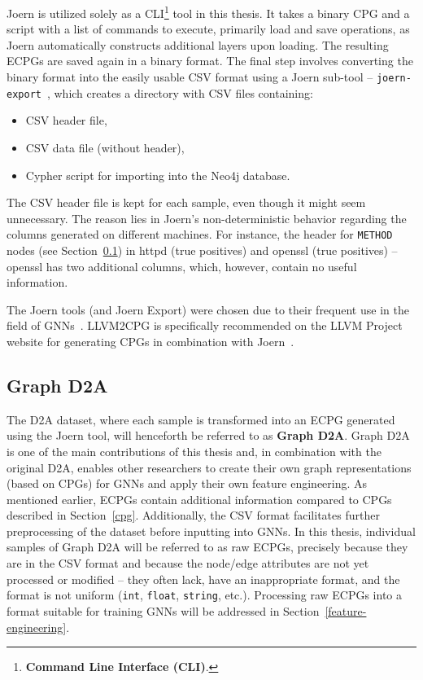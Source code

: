 Joern is utilized solely as a CLI\footnote{\textbf{Command Line Interface (CLI)}.} tool in this thesis. It takes a binary CPG and a script with a list of commands to execute, primarily load and save operations, as Joern automatically constructs additional layers upon loading. The resulting ECPGs are saved again in a binary format. The final step involves converting the binary format into the easily usable CSV format using a Joern sub-tool -- \texttt{joern-export}~\cite{joern-doc}, which creates a directory with CSV files containing:
\begin{itemize}
    \item CSV header file,
    \item CSV data file (without header),
    \item Cypher script for importing into the Neo4j database.
\end{itemize}

The CSV header file is kept for each sample, even though it might seem unnecessary. The reason lies in Joern's non-deterministic behavior regarding the columns generated on different machines. For instance, the header for \texttt{METHOD} nodes (see Section~\ref{graph-d2a}) in httpd (true positives) and openssl (true positives) -- openssl has two additional columns, which, however, contain no useful information.

The Joern tools (and Joern Export) were chosen due to their frequent use in the field of GNNs~\cite{GNN1-cao2021bgnn4vd, JOERN-CPG-guan2020code, GNN4-IBM-suneja2020learning, JOERN-CPG-xiaomeng2018cpgva, GNN2-zhou2019devign}. LLVM2CPG is specifically recommended on the LLVM Project website for generating CPGs in combination with Joern~\cite{llvm2cpg-webpage}.

\subsection{Graph D2A}
\label{graph-d2a}
The D2A dataset, where each sample is transformed into an ECPG generated using the Joern tool, will henceforth be referred to as \textbf{Graph D2A}. Graph D2A is one of the main contributions of this thesis and, in combination with the original D2A, enables other researchers to create their own graph representations (based on CPGs) for GNNs and apply their own feature engineering. As mentioned earlier, ECPGs contain additional information compared to CPGs described in Section~\ref{cpg}. Additionally, the CSV format facilitates further preprocessing of the dataset before inputting into GNNs. In this thesis, individual samples of Graph D2A will be referred to as raw ECPGs, precisely because they are in the CSV format and because the node/edge attributes are not yet processed or modified -- they often lack, have an inappropriate format, and the format is not uniform (\texttt{int}, \texttt{float}, \texttt{string}, etc.). Processing raw ECPGs into a format suitable for training GNNs will be addressed in Section~\ref{feature-engineering}.

